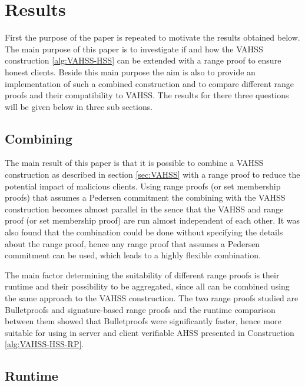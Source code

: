\chapter{Results}
\label{ch:results}

First the purpose of the paper is repeated to motivate the results obtained below. The main purpose of this paper is to investigate if  and how the VAHSS construction \ref{alg:VAHSS-HSS} can be extended with a range proof to ensure honest clients. Beside this main purpose the aim is also to provide an implementation of such a combined construction and to compare different range proofs and their compatibility to VAHSS. The results for there three questions will be given below in three sub sections. 

\section{Combining}
The main result of this paper is that it is possible to combine a VAHSS construction as described in section \ref{sec:VAHSS} with a range proof to reduce the potential impact of malicious clients. Using range proofs (or set membership proofs) that assumes a Pedersen commitment the combining with the VAHSS construction becomes almost parallel in the sence that the VAHSS and range proof (or set membership proof) are run almost independent of each other. It was also found that the combination could be done without specifying the details about the range proof, hence any range proof that assumes a Pedersen commitment can be used, which leads to a highly flexible combination.  

The main factor determining the suitability of different range proofs is their runtime and their possibility to be aggregated, since all can be combined using the same approach to the VAHSS construction. The two range proofs studied are Bulletproofs and signature-based range proofs and the runtime comparison between them showed that Bulletproofs were significantly faster, hence more suitable for using in server and client verifiable AHSS presented in Construction \ref{alg:VAHSS-HSS-RP}. 

\section{Runtime}

